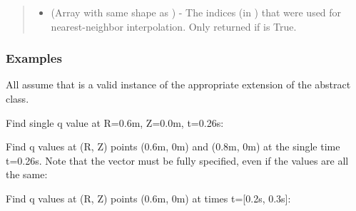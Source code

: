 \documentclass[letterpaper,10pt,english]{sphinxmanual}
\begin{document}
\begin{fulllineitems}
\begin{fulllineitems}
\begin{quote}
\begin{description}
\begin{itemize}
\item {} 
 (Array with same shape as ) - The indices
(in ) that were used for
nearest-neighbor interpolation. Only returned if  is
True.

\end{itemize}


\end{description}\end{quote}
\subsubsection*{Examples}

All assume that  is a valid instance of the
appropriate extension of the {\hyperref[\detokenize{eqtools:eqtools.core.Equilibrium}]{}} abstract class.

Find single q value at R=0.6m, Z=0.0m, t=0.26s:

\begin{sphinxVerbatim}[commandchars=\\\{\}]
    
\end{sphinxVerbatim}

Find q values at (R, Z) points (0.6m, 0m) and (0.8m, 0m) at the
single time t=0.26s. Note that the  vector must be fully specified,
even if the values are all the same:

\begin{sphinxVerbatim}[commandchars=\\\{\}]
  \PYG{p}{[} \PYG{p}{]} \PYG{p}{[} \PYG{p}{]} 
\end{sphinxVerbatim}

Find q values at (R, Z) points (0.6m, 0m) at times t={[}0.2s, 0.3s{]}:

\begin{sphinxVerbatim}[commandchars=\\\{\}]
    \PYG{p}{[} \PYG{p}{]}
\end{sphinxVerbatim}


\end{fulllineitems}
\end{fulllineitems}
\end{document}
